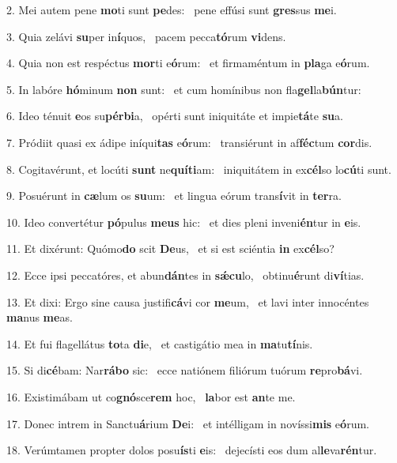 2. Mei autem pene \textbf{mo}ti sunt \textbf{pe}des: \ast\  pene effúsi sunt \textbf{gres}sus \textbf{me}i.\

3. Quia zelávi \textbf{su}per in\textbf{í}quos, \ast\  pacem pecca\textbf{tó}rum \textbf{vi}dens.\

4. Quia non est respéctus \textbf{mor}ti e\textbf{ó}rum: \ast\  et firmaméntum in \textbf{pla}ga e\textbf{ó}rum.\

5. In labóre \textbf{hó}minum \textbf{non} sunt: \ast\  et cum homínibus non fla\textbf{gel}la\textbf{bún}tur:\

6. Ideo ténuit \textbf{e}os su\textbf{pér}\textbf{bi}a, \ast\  opérti sunt iniquitáte et impie\textbf{tá}te \textbf{su}a.\

7. Pródiit quasi ex ádipe iníqui\textbf{tas} e\textbf{ó}rum: \ast\  transiérunt in af\textbf{féc}tum \textbf{cor}dis.\

8. Cogitavérunt, et locúti \textbf{sunt} ne\textbf{quí}\textbf{ti}am: \ast\  iniquitátem in ex\textbf{cél}so lo\textbf{cú}ti sunt.\

9. Posuérunt in \textbf{cæ}lum os \textbf{su}um: \ast\  et lingua eórum trans\textbf{í}vit in \textbf{ter}ra.\

10. Ideo convertétur \textbf{pó}pulus \textbf{me}\textbf{us} hic: \ast\  et dies pleni inveni\textbf{én}tur in \textbf{e}is.\

11. Et dixérunt: Quómo\textbf{do} scit \textbf{De}us, \ast\  et si est sciéntia \textbf{in} ex\textbf{cél}so?\

12. Ecce ipsi peccatóres, et abun\textbf{dán}tes in \textbf{sǽ}\textbf{cu}lo, \ast\  obtinu\textbf{é}runt di\textbf{ví}tias.\

13. Et dixi: Ergo sine causa justifi\textbf{cá}vi cor \textbf{me}um, \ast\  et lavi inter innocéntes \textbf{ma}nus \textbf{me}as.\

14. Et fui flagellátus \textbf{to}ta \textbf{di}e, \ast\  et castigátio mea in \textbf{ma}tu\textbf{tí}nis.\

15. Si di\textbf{cé}bam: Nar\textbf{rá}\textbf{bo} sic: \ast\  ecce natiónem filiórum tuórum \textbf{re}pro\textbf{bá}vi.\

16. Existimábam ut co\textbf{gnó}sce\textbf{rem} hoc, \ast\  \textbf{la}bor est \textbf{an}te me.\

17. Donec intrem in Sanctu\textbf{á}rium \textbf{De}i: \ast\  et intélligam in novíssi\textbf{mis} e\textbf{ó}rum.\

18. Verúmtamen propter dolos posu\textbf{ís}ti \textbf{e}is: \ast\  dejecísti eos dum al\textbf{le}va\textbf{rén}tur.\

